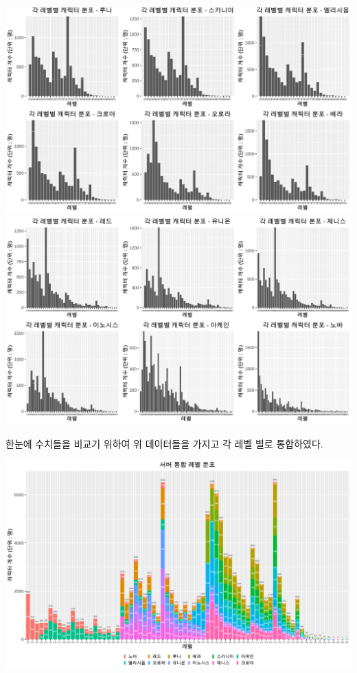 \documentclass[
]{article}
\begin{document}
\includegraphics{123_files/figure-latex/ranking_server_level-1.pdf}
\includegraphics{123_files/figure-latex/ranking_server_level-2.pdf}

한눈에 수치들을 비교기 위하여 위 데이터들을 가지고 각 레벨 별로
통합하였다.

\includegraphics{123_files/figure-latex/ranking_server_job_3-1.pdf}
\end{document}
